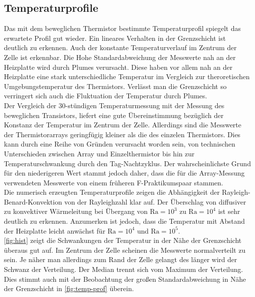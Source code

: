 \subsection{Temperaturprofile}
Das mit dem beweglichen Thermistor bestimmte Temperaturprofil spiegelt das erwartete Profil gut wieder.
Ein lineares Verhalten in der Grenzschicht ist deutlich zu erkennen. Auch der konstante Temperaturverlauf im Zentrum der Zelle ist erkennbar.
Die Hohe Standardabweichung der Messwerte nah an der Heizplatte wird durch Plumes verursacht. Diese haben vor allem nah an der Heizplatte eine stark unterschiedliche Temperatur im Vergleich zur theroretischen Umgebungstemperatur des Thermistors.
Verlässt man die Grenzschicht so verringert sich auch die Fluktuation der Temperatur durch Plumes.
\\
Der Vergleich der 30-stündigen Temperaturmessung mit der Messung des beweglichen Transistors, liefert eine gute Übereinstimmung bezüglich der Konstanz der Temperatur im Zentrum der Zelle.
Allerdings sind die Messwerte der Thermistorarrays geringfügig kleiner als die des einzelen Thermistors. 
Dies kann durch eine Reihe von Gründen verursacht worden sein, von technischen Unterschieden zwischen Array und Einzelthermistor bis hin zur Temperaturschwankung durch den Tag-Nachtzyklus.
Der wahrscheinlichste Grund für den niederigeren Wert stammt jedoch daher, dass die für die Array-Messung verwendeten Messwerte von einem früheren F-Praktikumspaar stammen.
\\
Die numerisch erzeugten Temperaturprofile zeigen die Abhängigkeit der Rayleigh-Benard-Konvektion von der Rayleighzahl klar auf. 
Der Überschlag von diffusiver zu konvektiver Wärmeleitung bei Übergang von $\text{Ra}=10^3$ zu $\text{Ra}=10^4$ ist sehr deutlich zu erkennen.
Anzumerken ist jedoch, dass die Temperatur mit Abstand der Heizplatte leicht anwächst für $\text{Ra} = 10^4$ und $\text{Ra} = 10^5$.
\\
\cref{fig:hist} zeigt die Schwankungen der Temperatur in der Nähe der Grenzschicht überaus gut auf. Im Zentrum der Zelle scheinen die Messwerte normalverteilt zu sein. Je näher man allerdings zum Rand der Zelle gelangt des länger wird der Schwanz der Verteilung. Der Median trennt sich vom Maximum der Verteilung. 
Dies stimmt auch mit der Beobachtung der großen Standardabweichung in Nähe der Grenzschicht in \cref{fig:temp-prof} überein.

